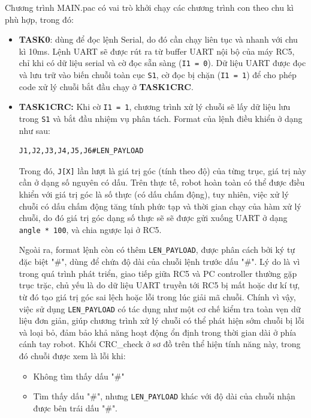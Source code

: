 Chương trình MAIN.pac có vai trò khởi chạy các chương trình con theo chu kì phù hợp, trong đó:
\begin{itemize}
    \item \textbf{TASK0}: dùng để đọc lệnh Serial, do đó cần chạy liên tục và nhanh với chu kì 10ms. Lệnh UART sẽ được rút ra từ buffer UART nội bộ của máy RC5, chỉ khi có dữ liệu serial và cờ đọc sẵn sàng (\lstinline[style=inlinecode]{I1 = 0}). Dữ liệu UART được đọc và lưu trữ vào biến chuỗi toàn cục \lstinline[style=inlinecode]{S1}, cờ đọc bị chặn (\lstinline[style=inlinecode]{I1 = 1}) để cho phép code xử lý chuỗi bắt đầu chạy ở \textbf{TASK1CRC}.
    \item \textbf{TASK1CRC:} Khi cờ \lstinline[style=inlinecode]{I1 = 1}, chương trình xử lý chuỗi sẽ lấy dữ liệu lưu trong \lstinline[style=inlinecode]{S1} và bắt đầu nhiệm vụ phân tách. Format của lệnh điều khiển ở dạng như sau:
    \begin{lstlisting}[language={}]
    J1,J2,J3,J4,J5,J6#LEN_PAYLOAD
\end{lstlisting}
    Trong đó, \lstinline[style=inlinecode]{J[X]} lần lượt là giá trị góc (tính theo độ) của từng trục, giá trị này cần ở dạng số nguyên có dấu. Trên thực tế, robot hoàn toàn có thể được điều khiển với giá trị góc là số thực (có dấu chấm động), tuy nhiên, việc xử lý chuỗi có dấu chấm động tăng tính phức tạp và thời gian chạy của hàm xử lý chuỗi, do đó giá trị góc dạng số thực sẽ sẽ được gửi xuống UART ở dạng \lstinline[style=inlinecode]{angle * 100}, và chia ngược lại ở RC5. 

    Ngoài ra, format lệnh còn có thêm \lstinline[style=inlinecode]{LEN_PAYLOAD}, được phân cách bởi ký tự đặc biệt "\#", dùng để chứa độ dài của chuỗi lệnh trước dấu "\#". Lý do là vì trong quá trình phát triển, giao tiếp giữa RC5 và PC controller thường gặp trục trặc, chủ yếu là do dữ liệu UART truyền tới RC5 bị mất hoặc dư kí tự, từ đó tạo giá trị góc sai lệch hoặc lỗi trong lúc giải mã chuỗi. Chính vì vậy, việc sử dụng \lstinline[style=inlinecode]{LEN_PAYLOAD} có tác dụng như một cơ chế kiểm tra toàn vẹn dữ liệu đơn giản, giúp chương trình xử lý chuỗi có thể phát hiện sớm chuỗi bị lỗi và loại bỏ, đảm bảo khả năng hoạt động ổn định trong thời gian dài ở phía cánh tay robot. Khối CRC\_check ở sơ đồ trên thể hiện tính năng này, trong đó chuỗi được xem là lỗi khi:
    \begin{itemize}
        \item Không tìm thấy dấu "\#"
        \item Tìm thấy dấu "\#", nhưng \lstinline[style=inlinecode]{LEN_PAYLOAD} khác với độ dài của chuỗi nhận được bên trái dấu "\#".
    \end{itemize}


\end{itemize}
